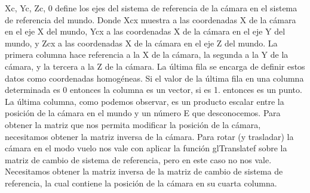 \documentclass[12pt,a4paper]{article}
\begin{document}
\begin{enumerate}
\begin{enumerate}
\begin{enumerate}
Xc, Yc, Zc, 0 define los ejes del sistema de referencia de la cámara en el sistema de referencia del mundo. Donde Xcx muestra a las coordenadas X de la cámara en el eje X del mundo, Ycx a las coordenadas X de la cámara en el eje Y del mundo, y Zcx a las coordenadas X de la cámara en el eje Z del mundo. La primera columna hace referencia a la X de la cámara, la segunda a la Y de la cámara, y la tercera a la Z de la cámara. La última fila se encarga de definir estos datos como coordenadas homogéneas. Si el valor de la última fila en una columna determinada es 0 entonces la columna es un vector, si es 1. entonces es un punto.\newline
La última columna, como podemos observar, es un producto escalar entre la posición de la cámara en el mundo y un número E que desconocemos.\newline
Para obtener la matriz que nos permita modificar la posición de la cámara, necesitamos obtener la matriz inversa de la cámara. Para rotar (y trasladar) la cámara en el modo vuelo nos vale con aplicar la función glTranslatef sobre la matriz de cambio de sistema de referencia, pero en este caso no nos vale. Necesitamos obtener la matriz inversa de la matriz de cambio de sistema de referencia, la cual contiene la posición de la cámara en su cuarta columna.\newline


\end{enumerate}
\end{enumerate}
\end{enumerate}
\end{document}
